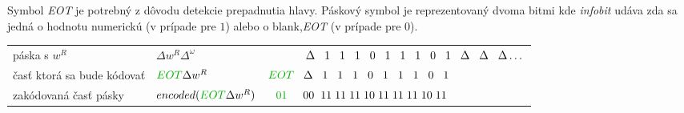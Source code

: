 \documentclass[11pt,a4paper]{article}
\newcommand{\green}[1]{\textcolor{OliveGreen}{#1}}
\begin{document}
Symbol \textit{EOT} je potrebný z dôvodu detekcie prepadnutia hlavy. Páskový symbol je reprezentovaný dvoma bitmi kde \textit{infobit} udáva zda sa jedná o hodnotu numerickú (v prípade pre $1$) alebo o blank,\textit{EOT} (v prípade pre $0$).

\begin{center}
    \begin{tabular}{l|l|l}
        páska s $w^R$ & $\Delta w^R \Delta^\omega$ & $\hspace{11.75mm} \Delta \hspace{3mm} 1 \hspace{3mm} 1 \hspace{3mm} 1 \hspace{3mm} 0 \hspace{3mm} 1 \hspace{3mm} 1 \hspace{3mm} 1 \hspace{3mm} 0 \hspace{3mm} 1 \hspace{3mm} \Delta \hspace{3mm} \Delta \hspace{3mm} \Delta \dots$ \\
        časť ktorá sa bude kódovať & $\green{EOT} \Delta w^R$ & $ \green{EOT} \hspace{3mm} \Delta \hspace{3mm} 1 \hspace{3mm} 1 \hspace{3mm} 1 \hspace{3mm} 0 \hspace{3mm} 1 \hspace{3mm} 1 \hspace{3mm} 1 \hspace{3mm} 0 \hspace{3mm} 1$ \\
        zakódovaná časť pásky & $encoded(\green{EOT} \Delta w^R)$ & $\hspace{2.5mm} \green{01} \hspace{5mm} 00 \hspace{2mm} 11 \hspace{1mm} 11 \hspace{1mm} 11 \hspace{1mm} 10 \hspace{1mm} 11 \hspace{1mm} 11 \hspace{1mm} 11 \hspace{1mm} 10 \hspace{1mm} 11$
    \end{tabular}
\end{center}
\end{document}

